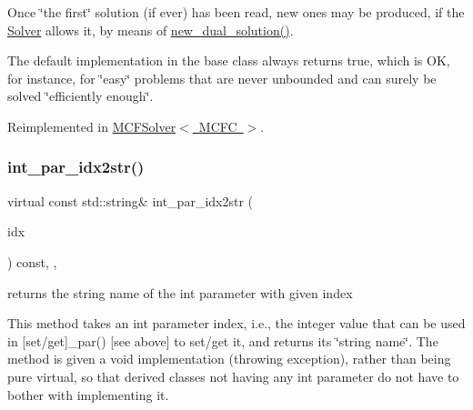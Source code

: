 Once \char`\"{}the first\char`\"{} solution (if ever) has been read, new ones may be produced, if the \mbox{\hyperlink{class_s_m_spp__di__unipi__it_1_1_solver}{Solver}} allows it, by means of \mbox{\hyperlink{class_s_m_spp__di__unipi__it_1_1_c_d_a_solver_a8c650415b6673c33692c363abdfdef00}{new\+\_\+dual\+\_\+solution()}}.

The default implementation in the base class always returns true, which is OK, for instance, for \char`\"{}easy\char`\"{} problems that are never unbounded and can surely be solved \char`\"{}efficiently enough\char`\"{}. 

Reimplemented in \mbox{\hyperlink{class_s_m_spp__di__unipi__it_1_1_m_c_f_solver_ac179f31ab4f3e55a7f03b152d065edbd}{M\+C\+F\+Solver$<$ M\+C\+F\+C $>$}}.

\mbox{\label{class_s_m_spp__di__unipi__it_1_1_c_d_a_solver_a61e973f39747f63b8f56d97cc62e32ce}} 
\subsubsection{\texorpdfstring{int\+\_\+par\+\_\+idx2str()}{int\_par\_idx2str()}}
{\footnotesize\ttfamily virtual const std\+::string\& int\+\_\+par\+\_\+idx2str (\begin{DoxyParamCaption}\item[{const \mbox{\hyperlink{class_s_m_spp__di__unipi__it_1_1_thin_compute_interface_aa3d710629ad8c434286726ad810c3b47}{idx\+\_\+type}}}]{idx }\end{DoxyParamCaption}) const\hspace{0.3cm}{\ttfamily [inline]}, {\ttfamily [override]}, {\ttfamily [virtual]}}



returns the string name of the int parameter with given index 

This method takes an int parameter index, i.\+e., the integer value that can be used in \mbox{[}set/get\mbox{]}\+\_\+par() \mbox{[}see above\mbox{]} to set/get it, and returns its \char`\"{}string name\char`\"{}. The method is given a void implementation (throwing exception), rather than being pure virtual, so that derived classes not having any int parameter do not have to bother with implementing it. 


